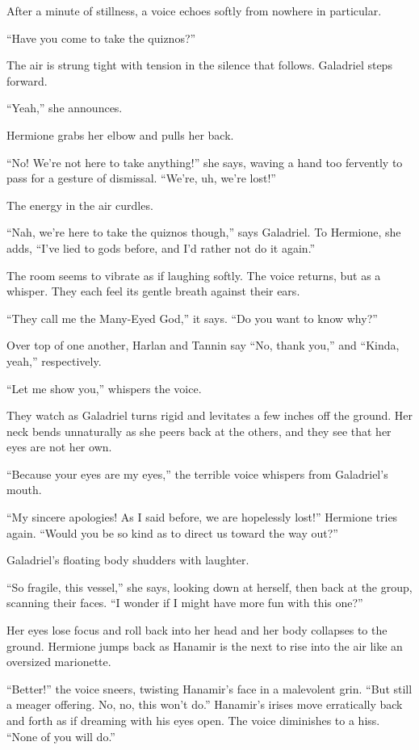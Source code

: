 \documentclass[smalldemyvopaper,11pt,twoside,onecolumn,openright,extrafontsizes]{memoir}
\begin{document}
After a minute of stillness, a voice echoes softly from nowhere in
particular.

``Have you come to take the quiznos?''

The air is strung tight with tension in the silence that follows.
Galadriel steps forward.

``Yeah,'' she announces.

Hermione grabs her elbow and pulls her back.

``No! We're not here to take anything!'' she says, waving a hand too
fervently to pass for a gesture of dismissal. ``We're, uh, we're lost!''

The energy in the air curdles.

``Nah, we're here to take the quiznos though,'' says Galadriel. To
Hermione, she adds, ``I've lied to gods before, and I'd rather not do it
again.''

The room seems to vibrate as if laughing softly. The voice returns, but
as a whisper. They each feel its gentle breath against their ears.

``They call me the Many-Eyed God,'' it says. ``Do you want to know
why?''

Over top of one another, Harlan and Tannin say ``No, thank you,'' and
``Kinda, yeah,'' respectively.

``Let me show you,'' whispers the voice.

They watch as Galadriel turns rigid and levitates a few inches off the
ground. Her neck bends unnaturally as she peers back at the others, and
they see that her eyes are not her own.

``Because your eyes are my eyes,'' the terrible voice whispers from
Galadriel's mouth.

``My sincere apologies! As I said before, we are hopelessly lost!''
Hermione tries again. ``Would you be so kind as to direct us toward the
way out?''

Galadriel's floating body shudders with laughter.

``So fragile, this vessel,'' she says, looking down at herself, then
back at the group, scanning their faces. ``I wonder if I might have more
fun with this one?''

Her eyes lose focus and roll back into her head and her body collapses
to the ground. Hermione jumps back as Hanamir is the next to rise into
the air like an oversized marionette.

``Better!'' the voice sneers, twisting Hanamir's face in a malevolent
grin. ``But still a meager offering. No, no, this won't do.'' Hanamir's
irises move erratically back and forth as if dreaming with his eyes
open. The voice diminishes to a hiss. ``None of you will do.''
\end{document}
